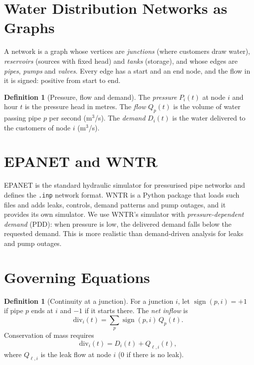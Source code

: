 \documentclass[11pt,letterpaper]{report}
\theoremstyle{definition}
\newtheorem{definition}[theorem]{Definition}
\theoremstyle{plain}
\theoremstyle{remark}
\begin{document}
\section{Water Distribution Networks as Graphs}
A network is a graph whose vertices are \emph{junctions} (where customers draw water), \emph{reservoirs} (sources with fixed head) and \emph{tanks} (storage), and whose edges are \emph{pipes}, \emph{pumps} and \emph{valves}. Every edge has a start and an end node, and the flow in it is signed: positive from start to end.

\begin{definition}[Pressure, flow and demand]\label{def:pfd}
The \emph{pressure} $P_i(t)$ at node $i$ and hour $t$ is the pressure head in metres. The \emph{flow} $Q_p(t)$ is the volume of water passing pipe $p$ per second (m$^3$/s). The \emph{demand} $D_i(t)$ is the water delivered to the customers of node $i$ (m$^3$/s).
\end{definition}

\section{EPANET and WNTR}
EPANET \cite{epanet} is the standard hydraulic simulator for pressurised pipe networks and defines the \texttt{.inp} network format. WNTR \cite{wntr} is a Python package that loads such files and adds leaks, controls, demand patterns and pump outages, and it provides its own simulator. We use WNTR's simulator with \emph{pressure-dependent demand} (PDD): when pressure is low, the delivered demand falls below the requested demand. This is more realistic than demand-driven analysis for leaks and pump outages.

\section{Governing Equations}
\begin{definition}[Continuity at a junction]\label{def:balance}
For a junction $i$, let $\operatorname{sign}(p,i)=+1$ if pipe $p$ ends at $i$ and $-1$ if it starts there. The \emph{net inflow} is
\begin{equation}
\mathrm{div}_i(t)=\sum_{p}\operatorname{sign}(p,i)\,Q_p(t).
\end{equation}
Conservation of mass requires
\begin{equation}\label{eq:balance}
\mathrm{div}_i(t)=D_i(t)+Q_{\ell,i}(t),
\end{equation}
where $Q_{\ell,i}$ is the leak flow at node $i$ ($0$ if there is no leak).
\end{definition}
\end{document}
